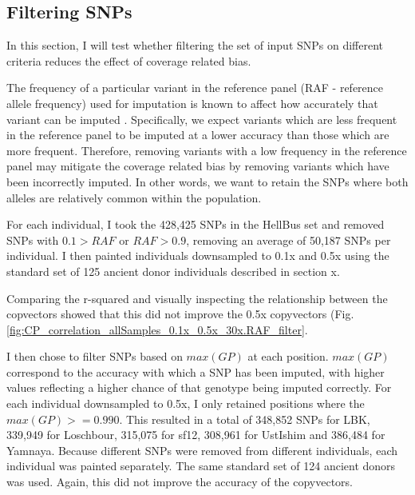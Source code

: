\subsection{Filtering SNPs}

In this section, I will test whether filtering the set of input SNPs on different criteria reduces the effect of coverage related bias. 

The frequency of a particular variant in the reference panel (RAF - reference allele frequency) used for imputation is known to affect how accurately that variant can be imputed \cite{rubinacci2021efficient, delaneau2018integrative, Browning2016, hui2020evaluating}. Specifically, we expect variants which are less frequent in the reference panel to be imputed at a lower accuracy than those which are more frequent. Therefore, removing variants with a low frequency in the reference panel may mitigate the coverage related bias by removing variants which have been incorrectly imputed. In other words, we want to retain the SNPs where both alleles are relatively common within the population. 

For each individual, I took the 428,425 SNPs in the HellBus set and removed SNPs with $0.1 > RAF$ or $RAF > 0.9$, removing an average of 50,187 SNPs per individual. I then painted individuals downsampled to 0.1x and 0.5x using the standard set of 125 ancient donor individuals described in section x.  

Comparing the r-squared and visually inspecting the relationship between the copvectors showed that this did not improve the 0.5x copyvectors (Fig.  \ref{fig:CP_correlation_allSamples_0.1x_0.5x_30x.RAF_filter}.

I then chose to filter SNPs based on $max(GP)$ at each position. $max(GP)$ correspond to the accuracy with which a SNP has been imputed, with higher values reflecting a higher chance of that genotype being imputed correctly. For each individual downsampled to 0.5x, I only retained positions where the $max(GP) >= 0.990$. This resulted in a total of 348,852 SNPs for LBK, 339,949 for Loschbour, 315,075 for sf12, 308,961 for UstIshim and 386,484 for Yamnaya. Because different SNPs were removed from different individuals, each individual was painted separately. The same standard set of 124 ancient donors was used. Again, this did not improve the accuracy of the copyvectors. 

